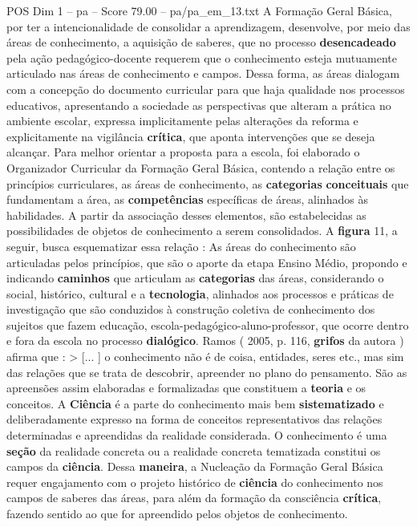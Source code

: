 \begin{textsample}{POS Dim 1 – pa – Score 79.00 – pa/pa\_em\_13.txt}
A Formação Geral Básica, por ter a intencionalidade de consolidar a aprendizagem, desenvolve, por meio das áreas de conhecimento, a aquisição de saberes, que no processo \textbf{desencadeado} pela ação pedagógico-docente requerem que o conhecimento esteja mutuamente articulado nas áreas de conhecimento e campos.
Dessa forma, as áreas dialogam com a concepção do documento curricular para que haja qualidade nos processos educativos, apresentando a sociedade as perspectivas que alteram a prática no ambiente escolar, expressa implicitamente pelas alterações da reforma e explicitamente na vigilância \textbf{crítica}, que aponta intervenções que se deseja alcançar.
Para melhor orientar a proposta para a escola, foi elaborado o Organizador Curricular da Formação Geral Básica, contendo a relação entre os princípios curriculares, as áreas de conhecimento, as \textbf{categorias} \textbf{conceituais} que fundamentam a área, as \textbf{competências} específicas de áreas, alinhados às habilidades.
A partir da associação desses elementos, são estabelecidas as possibilidades de objetos de conhecimento a serem consolidados.
A \textbf{figura} 11, a seguir, busca esquematizar essa relação : As áreas do conhecimento são articuladas pelos princípios, que são o aporte da etapa Ensino Médio, propondo e indicando \textbf{caminhos} que articulam as \textbf{categorias} das áreas, considerando o social, histórico, cultural e a \textbf{tecnologia}, alinhados aos processos e práticas de investigação que são conduzidos à construção coletiva de conhecimento dos sujeitos que fazem educação, escola-pedagógico-aluno-professor, que ocorre dentro e fora da escola no processo \textbf{dialógico}.
Ramos ( 2005, p. 116, \textbf{grifos} da autora ) afirma que : > [... ] o conhecimento não é de coisa, entidades, seres etc., mas sim das relações que se trata de descobrir, apreender no plano do pensamento.
São as apreensões assim elaboradas e formalizadas que constituem a \textbf{teoria} e os conceitos.
A \textbf{Ciência} é a parte do conhecimento mais bem \textbf{sistematizado} e deliberadamente expresso na forma de conceitos representativos das relações determinadas e apreendidas da realidade considerada.
O conhecimento é uma \textbf{seção} da realidade concreta ou a realidade concreta tematizada constitui os campos da \textbf{ciência}.
Dessa \textbf{maneira}, a Nucleação da Formação Geral Básica requer engajamento com o projeto histórico de \textbf{ciência} do conhecimento nos campos de saberes das áreas, para além da formação da consciência \textbf{crítica}, fazendo sentido ao que for apreendido pelos objetos de conhecimento.

\end{textsample}
